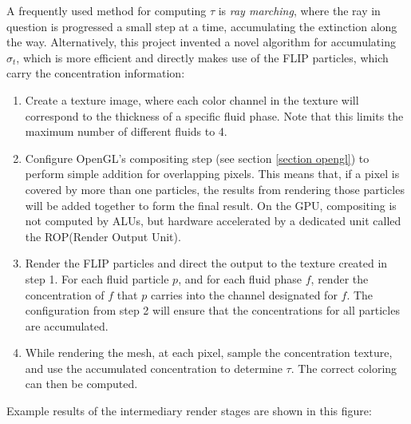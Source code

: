 A frequently used method for computing $\tau$ is \textit{ray marching}, where the ray in question is progressed a small step at a time, accumulating the extinction along the way. Alternatively, this project invented a novel algorithm for accumulating $\sigma_t$, which is more efficient and directly makes use of the FLIP particles, which carry the concentration information:
\begin{enumerate}
    \item 
    Create a texture image, where each color channel in the texture will correspond to the thickness of a specific fluid phase. Note that this limits the maximum number of different fluids to 4.

    \item 
    Configure OpenGL's compositing step (see section \ref{section opengl}) to perform simple addition for overlapping pixels. This means that, if a pixel is covered by more than one particles, the results from rendering those particles will be added together to form the final result. On the GPU, compositing is not computed by ALUs, but hardware accelerated by a dedicated unit called the ROP(Render Output Unit).

    \item 
    Render the FLIP particles and direct the output to the texture created in step 1. For each fluid particle $p$, and for each fluid phase $f$, render the concentration of $f$ that $p$ carries into the channel designated for $f$. The configuration from step 2 will ensure that the concentrations for all particles are accumulated.

    \item 
    While rendering the mesh, at each pixel, sample the concentration texture, and use the accumulated concentration to determine $\tau$. The correct coloring can then be computed.
    
\end{enumerate}
Example results of the intermediary render stages are shown in this figure:





\newpage
\thispagestyle{empty}
    

\addtolength{\topmargin}{-.875in}

